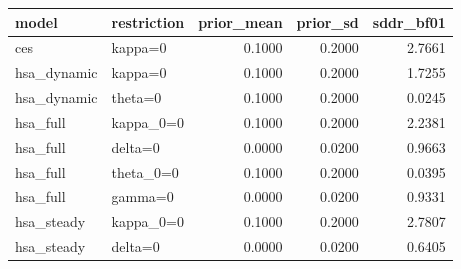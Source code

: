 \begin{tabular}{llrrr}
\toprule
model & restriction & prior\_mean & prior\_sd & sddr\_bf01 \\
\midrule
ces & kappa=0 & 0.1000 & 0.2000 & 2.7661 \\
hsa\_dynamic & kappa=0 & 0.1000 & 0.2000 & 1.7255 \\
hsa\_dynamic & theta=0 & 0.1000 & 0.2000 & 0.0245 \\
hsa\_full & kappa\_0=0 & 0.1000 & 0.2000 & 2.2381 \\
hsa\_full & delta=0 & 0.0000 & 0.0200 & 0.9663 \\
hsa\_full & theta\_0=0 & 0.1000 & 0.2000 & 0.0395 \\
hsa\_full & gamma=0 & 0.0000 & 0.0200 & 0.9331 \\
hsa\_steady & kappa\_0=0 & 0.1000 & 0.2000 & 2.7807 \\
hsa\_steady & delta=0 & 0.0000 & 0.0200 & 0.6405 \\
\bottomrule
\end{tabular}
